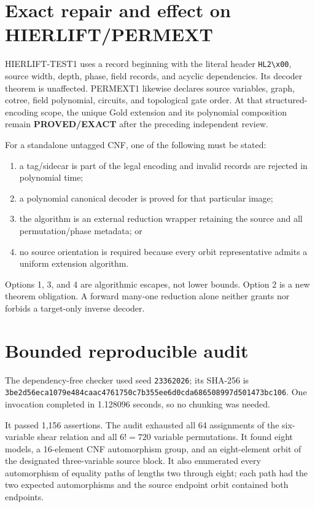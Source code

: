 \documentclass[11pt]{article}
\newcommand{\EXACT}{\textbf{PROVED/EXACT}}
\begin{document}
\section{Exact repair and effect on HIERLIFT/PERMEXT}
HIERLIFT-TEST1 uses a record beginning with the literal header
\texttt{HL2\textbackslash x00}, source width, depth, phase, field records, and
acyclic dependencies.  Its decoder theorem is unaffected.  PERMEXT1 likewise
declares source variables, graph, cotree, field polynomial, circuits, and
topological gate order.  At that structured-encoding scope, the unique Gold
extension and its polynomial composition remain \EXACT{} after the preceding
independent review.

For a standalone untagged CNF, one of the following must be stated:
\begin{enumerate}
\item a tag/sidecar is part of the legal encoding and invalid records are
rejected in polynomial time;
\item a polynomial canonical decoder is proved for that particular image;
\item the algorithm is an external reduction wrapper retaining the source and
all permutation/phase metadata; or
\item no source orientation is required because every orbit representative
admits a uniform extension algorithm.
\end{enumerate}
Options 1, 3, and 4 are algorithmic escapes, not lower bounds.  Option 2 is a
new theorem obligation.  A forward many-one reduction alone neither grants
nor forbids a target-only inverse decoder.

\section{Bounded reproducible audit}
The dependency-free checker
 used seed
\texttt{23362026}; its SHA-256 is
\texttt{3be2d56eca1079e484caac4761750c7b355ee6d0cda686508997d501473bc106}.
One invocation completed in 1.128096 seconds, so no chunking was needed.

It passed 1,156 assertions.  The audit exhausted all 64 assignments of the
six-variable shear relation and all $6!=720$ variable permutations.  It found
eight models, a 16-element CNF automorphism group, and an eight-element orbit
of the designated three-variable source block.  It also enumerated every
automorphism of equality paths of lengths two through eight; each path had the
two expected automorphisms and the source endpoint orbit contained both
endpoints.
\end{document}
